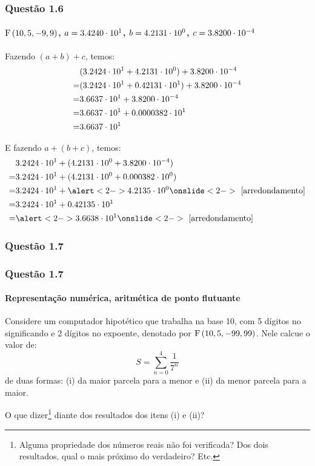 \begin{frame}
\frametitle{Questão 1.6}
\framesubtitle{$\mathrm{F}\left(10,5,-9,9\right)$, 
$a = 3.4240 \cdot 10^{1}$, 
$b = 4.2131 \cdot 10^{0}$,
$c = 3.8200 \cdot 10^{-4}$}

Fazendo $(a+b)+c$, temos:
{\tiny
\begin{align*}
& (\machinenumber{3.2424}{1} + \machinenumber{4.2131}{0}) +
\machinenumber{3.8200}{-4} \\
%
= &(\machinenumber{3.2424}{1} + \machinenumber{0.42131}{1}) +
\machinenumber{3.8200}{-4}\\
%
= &\machinenumber{3.6637}{1} +\machinenumber{3.8200}{-4}\\
%
= &\machinenumber{3.6637}{1} +\machinenumber{0.0000382}{1}\\
%
= &\machinenumber{3.6637}{1}\\
\end{align*}
}

E fazendo $a + (b+c)$, temos:
{\tiny
\begin{align*}
& \machinenumber{3.2424}{1} + 
  (\machinenumber{4.2131}{0} + \machinenumber{3.8200}{-4})\\
= &\machinenumber{3.2424}{1} + 
  (\machinenumber{4.2131}{0} + \machinenumber{0.000382}{0})\\
= &\machinenumber{3.2424}{1} + \alert<2->{\machinenumber{4.2135}{0}}
\onslide<2->{\text{ [arredondamento]}}\\
= &\machinenumber{3.2424}{1} + \machinenumber{0.42135}{1}\\
= &\alert<2->{\machinenumber{3.6638}{1}}\onslide<2->{\text{ [arredondamento]}}
\end{align*}
}

\end{frame}

\subsubsection{Questão 1.7}

\begin{frame}
\frametitle{Questão 1.7}
\framesubtitle{Representação numérica, aritmética de ponto flutuante}

Considere um computador hipotético que trabalha na base 10, com 5 dígitos no
significando e 2 dígitos no expoente, denotado por $\mathrm{F}\left(10,5,-99,99\right)$.
Nele calcue o valor de:
\[
S = \sum_{n=0}^{4} \frac{1}{7^n}
\]
de duas formas: (i) da maior parcela para a menor e (ii) da menor parcela para a
maior.

O que dizer\footnote{Alguma propriedade dos números reais não foi verificada?
Dos dois resultados, qual o mais próximo do verdadeiro? Etc.} diante dos
resultados dos itens (i) e (ii)?

\end{frame}

